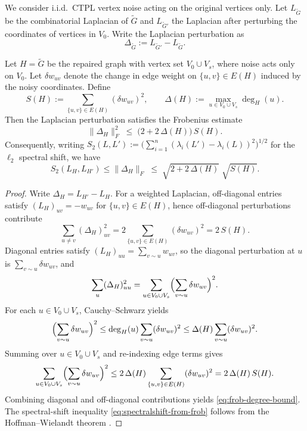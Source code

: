 \documentclass[
  11pt,
  letterpaper]{siamart251216}
\begin{document}
We consider i.i.d.~\ac{CTPL} vertex noise acting on the original
vertices only. Let \(L_{\widetilde G}\) be the combinatorial Laplacian
of \(\widetilde G\) and \(L_{\widetilde G'}\) the Laplacian after
perturbing the coordinates of vertices in \(V_0\). Write the Laplacian
perturbation as \[
\Delta_{\widetilde G} := L_{\widetilde G'} - L_{\widetilde G}.
\]

\begin{theorem}\label{thm:repair-spectral-bound}
Let $H = \widetilde G$ be the repaired graph with vertex set $V_0\cup V_s$, where noise acts only on $V_0$.
Let $\delta w_{uv}$ denote the change in edge weight on $\{u,v\}\in E(H)$ induced by the noisy coordinates.
Define
$$
S(H) := \sum_{\{u,v\}\in E(H)} (\delta w_{uv})^2,
\qquad
\Delta(H) := \max_{u\in V_0\cup V_s} \deg_H(u).
$$
Then the Laplacian perturbation satisfies the Frobenius estimate
\begin{equation}\label{eq:frob-degree-bound}
\|\Delta_H\|_F^2
\;\le\; \bigl(2 + 2\,\Delta(H)\bigr)\, S(H).
\end{equation}
Consequently, writing $S_2(L,L') := \bigl(\sum_{i=1}^n (\lambda_i(L')-\lambda_i(L))^2\bigr)^{1/2}$ for the $\ell_2$ spectral shift, we have
\begin{equation}\label{eq:spectralshift-from-frob}
S_2(L_H,L_{H'}) \le \|\Delta_H\|_F
\;\le\; \sqrt{2 + 2\,\Delta(H)} \;\sqrt{S(H)}.
\end{equation}
\end{theorem}

\begin{proof}
Write $\Delta_H = L_{H'}-L_H$.
For a weighted Laplacian, off-diagonal entries satisfy $(L_H)_{uv}=-w_{uv}$ for $\{u,v\}\in E(H)$, hence off-diagonal perturbations contribute
$$
\sum_{u\ne v} (\Delta_H)_{uv}^2
= 2 \sum_{\{u,v\}\in E(H)} (\delta w_{uv})^2
= 2\,S(H).
$$
Diagonal entries satisfy $(L_H)_{uu}=\sum_{v\sim u} w_{uv}$, so the diagonal perturbation at $u$ is
$\sum_{v\sim u}\delta w_{uv}$, and
$$
\sum_u (\Delta_H)_{uu}^2
= \sum_{u\in V_0\cup V_s} \Bigl(\sum_{v\sim u}\delta w_{uv}\Bigr)^2.
$$
For each $u\in V_0\cup V_s$, Cauchy--Schwarz yields
$$
\Bigl(\sum_{v\sim u}\delta w_{uv}\Bigr)^2
\le \deg_H(u)\sum_{v\sim u}(\delta w_{uv})^2
\le \Delta(H)\sum_{v\sim u}(\delta w_{uv})^2.
$$
Summing over $u\in V_0\cup V_s$ and re-indexing edge terms gives
$$
\sum_{u\in V_0\cup V_s}\Bigl(\sum_{v\sim u}\delta w_{uv}\Bigr)^2
\le 2\,\Delta(H)\sum_{\{u,v\}\in E(H)}(\delta w_{uv})^2
= 2\,\Delta(H)\,S(H).
$$
Combining diagonal and off-diagonal contributions yields \eqref{eq:frob-degree-bound}.
The spectral-shift inequality \eqref{eq:spectralshift-from-frob} follows from the Hoffman--Wielandt theorem
\cite{HoffmanWielandt1953}.
\end{proof}
\end{document}

